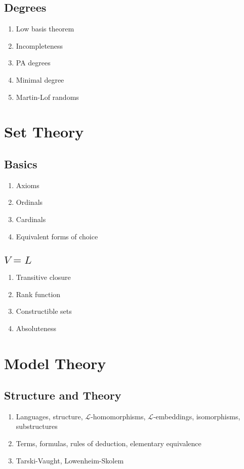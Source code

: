 \documentclass{article}
\begin{document}
\subsection{Degrees} 
\begin{enumerate}
  \item Low basis theorem
  \item Incompleteness
  \item PA degrees
  \item Minimal degree
  \item Martin-Lof randoms
\end{enumerate}

\section{Set Theory}
\subsection{Basics} 
\begin{enumerate}
  \item Axioms
  \item Ordinals
  \item Cardinals
  \item Equivalent forms of choice
\end{enumerate}

\subsection{$V=L$} 
\begin{enumerate}
  \item Transitive closure
  \item Rank function
  \item Constructible sets
  \item Absoluteness
\end{enumerate}

\section{Model Theory}
\subsection{Structure and Theory} 
\begin{enumerate}
  \item Languages, structure, $\mathcal{L}$-homomorphisms,
    $\mathcal{L}$-embeddings, isomorphisms, substructures
  \item Terms, formulas, rules of deduction, elementary equivalence
  \item Tarski-Vaught, Lowenheim-Skolem
\end{enumerate}
\end{document}
